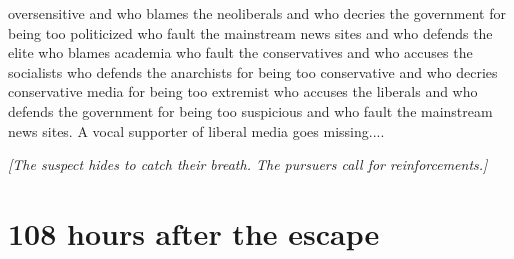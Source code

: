 \documentclass{report}
\begin{document}
oversensitive and who blames the neoliberals and who decries the government for being too politicized who fault the mainstream news sites and who defends the elite who blames academia who fault the conservatives and who accuses the socialists who defends the anarchists for being too conservative and who decries conservative media for being too extremist who accuses the liberals and who defends the government for being too suspicious and who fault the mainstream news sites. A vocal supporter of liberal media goes missing....

\textit{[The suspect hides to catch their breath. The pursuers call for reinforcements.]}


\section*{108 \small{hours after the escape}}
\end{document}
